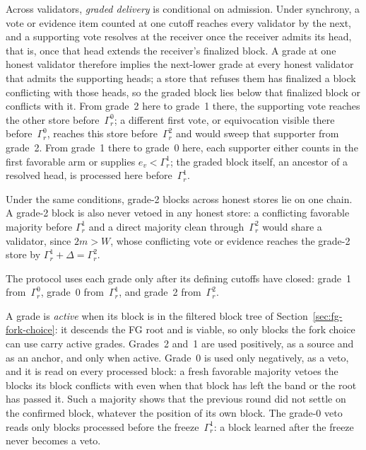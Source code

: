 \documentclass{article}
\theoremstyle{plain}
\theoremstyle{definition}
\theoremstyle{remark}
\begin{document}
Across validators, \emph{graded delivery} is conditional on admission.
Under synchrony, a vote or evidence item counted at one cutoff reaches
every validator by the next, and a supporting vote resolves at the
receiver once the receiver admits its head, that is, once that head
extends the receiver's finalized block.  A grade at one honest validator
therefore implies the next-lower grade at every honest validator that
admits the supporting heads; a store that refuses them has finalized a
block conflicting with those heads, so the graded block lies below that
finalized block or conflicts with it.
From grade~2 here to grade~1 there, the supporting vote reaches the other
store before~$\Gamma_r^0$; a different first vote, or equivocation visible
there before~$\Gamma_r^0$, reaches this store before~$\Gamma_r^2$ and would
sweep that supporter from grade~2.  From grade~1 there to grade~0 here,
each supporter either counts in the first favorable arm or supplies
$e_v<\Gamma_r^1$; the graded block itself, an ancestor of a resolved head,
is processed here before~$\Gamma_r^1$.

Under the same conditions, grade-2 blocks across honest stores lie on one
chain.  A grade-2 block is also never vetoed in any honest store: a
conflicting favorable majority before $\Gamma_r^1$ and a direct majority
clean through~$\Gamma_r^2$ would share a validator, since $2m>W$, whose
conflicting vote or evidence reaches the grade-2 store by
$\Gamma_r^1+\Delta=\Gamma_r^2$.

The protocol uses each grade only after its defining cutoffs have closed:
grade~1 from~$\Gamma_r^0$, grade~0 from~$\Gamma_r^1$, and grade~2
from~$\Gamma_r^2$.

A grade is \emph{active} when its block is in the filtered block tree of
Section~\ref{sec:fg-fork-choice}: it descends the FG root and is
viable, so only blocks the fork choice can use carry active grades.
Grades~2 and~1 are used positively, as a source and as an anchor, and
only when active.  Grade~0 is used only negatively, as a veto, and it is
read on every processed block: a fresh favorable majority vetoes the
blocks its block conflicts with even when that block has left the band
or the root has passed it.  Such a majority shows that the previous round
did not settle on the confirmed block, whatever the position of its own
block.  The grade-0 veto reads only blocks processed before the
freeze~$\Gamma_r^1$: a block learned after the freeze never becomes a
veto.
\end{document}
